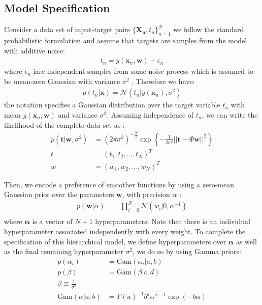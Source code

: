 \subsection{Model Specification}
Consider a data set of input-target pairs $\{\mathbf{X_n}, t_n\}^N_{n = 1}$ we follow the standard probabilistic formulation and assume that targets are samples from the model with additive noise: 
\begin{align}
    t_n = y(\mathbf{x}_n, \mathbf{w}) + \epsilon_n
\end{align}
where $\epsilon_n$ iare independent samples from some noise process which is assumed to be mean-zero Gaussian with variance $\sigma^2$ \cite{tipping}. Therefore we have:
\begin{align}
    p(t_n|\mathbf{x}) = \mathcal{N}(t_n|y(\mathbf{x}_n), \sigma^2)
\end{align}
the notation specifies a Gaussian distribution over the target variable $t_n$ with mean $y(\mathbf{x}_n, \mathbf{w})$ and variance $\sigma^2$. Assuming independence of $t_n$, we can write the likelihood of the complete data set as \cite{tipping}:
\begin{align}
    p(\mathbf{t}| \mathbf{w}, \sigma^2) &= (2 \pi \sigma^2)^{-\frac{N}{2}} \exp\left\{-\frac{1}{2\sigma^2}||\mathbf{t} - \Phi \mathbf{w}||^2\right\} \\
    t &= (t_1, t_2, ..., t_N)^T \\
    w &= (w_1, w_2, ..., w_N)^T
\end{align}

\noindent Then, we encode a preference of smoother functions by using a zero-mean Gaussian prior over the parameters $\mathbf{w}$, with precision $\alpha$ \cite{tipping}:
\begin{align}
    p(\mathbf{w}|\alpha) &= \prod_{i = 0}^{N} \mathcal{N}(w_i|0, \alpha^{-1}) \\
\end{align}
where $\mathbf{\alpha}$ is a vector of $N + 1$ hyperparameters. Note that there is an individual hyperparameter associated independently with every weight. To complete the specification of this hierarchical model, we define hyperparameters over $\mathbf{\alpha}$ as well as the final remaining hyperparameter $\sigma^2$, we do so by using Gamma priors\cite{tipping}:
\begin{align}
    p(\alpha_i) &= \text{Gam}(\alpha_i|a, b) \\
    p(\beta) &= \text{Gam}(\beta|c, d) \\
    \beta \equiv \frac{1}{\sigma^2} \\
    \text{Gam}(\alpha|a, b) &= \Gamma(a)^{-1} b^a \alpha^{a - 1} \exp(-b\alpha)
\end{align}

